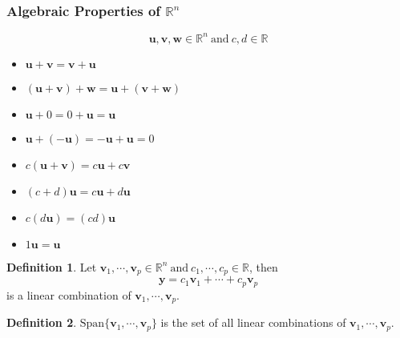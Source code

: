 \documentclass{article}
\renewcommand{\vec}[1]{\textbf{#1}}
\theoremstyle{definition}
\newtheorem{definition}{Definition}[section]
\theoremstyle{remark}
\theoremstyle{remark}
\theoremstyle{remark}
\newtheorem*{it follows}{It follows}
\begin{document}
\subsubsection{Algebraic Properties of $\mathbb{R}^n$}

\begin{equation}
  \vec{u}, \vec{v}, \vec{w} \in \mathbb{R}^n\ \text{and}\ c, d \in \mathbb{R}
\end{equation}

\begin{itemize}
  \item $\vec{u} + \vec{v} = \vec{v} + \vec{u}$
  \item $(\vec{u} + \vec{v}) + \vec{w} = \vec{u} + (\vec{v} + \vec{w})$
  \item $\vec{u} + 0 = 0 + \vec{u} = \vec{u}$
  \item $\vec{u} + (-\vec{u}) = -\vec{u} + \vec{u} = 0$
  \item $c(\vec{u} + \vec{v}) = c\vec{u} + c\vec{v}$
  \item $(c + d)\vec{u} = c\vec{u} + d\vec{u}$
  \item $c(d\vec{u}) = (cd)\vec{u}$
  \item $1\vec{u} = \vec{u}$
\end{itemize}

\begin{definition}
  Let $\vec{v}_1, \cdots, \vec{v}_p \in \mathbb{R}^n\ \text{and}\ c_1, \cdots, c_p \in \mathbb{R}$, then
  $$\vec{y} = c_1 \vec{v}_1 + \cdots + c_p \vec{v}_p$$
  is a linear combination of $\vec{v}_1, \cdots, \vec{v}_p$.
\end{definition}

\begin{definition}
  $\text{Span}\{\vec{v}_1, \cdots, \vec{v}_p\}$ is the set of all linear combinations of $\vec{v}_1, \cdots, \vec{v}_p$.
\end{definition}
\end{document}
